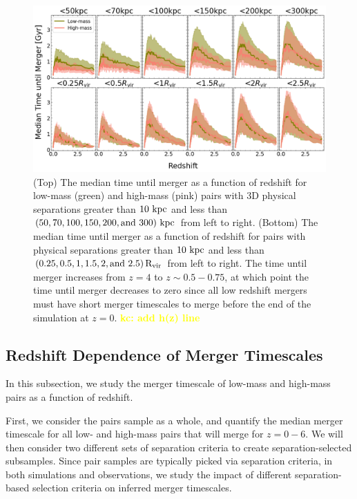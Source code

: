 \documentclass[twocolumn,linenumbers]{aastex631}
\newcommand{\kc}[1]{\textcolor{yellow}{\textbf{kc: #1}} }
\begin{document}
    \begin{figure}[htb]
        \centering
        \includegraphics[width=\textwidth]{plots/bet-on-it/3_time_til_merger.png}
        \caption{(Top) The median time until merger as a function of redshift for low-mass (green) and high-mass (pink) pairs with 3D physical separations greater than $10\,\mathrm{\,kpc}$ and less than $(50,70,100,150,200,\mbox{and }300)\,\mathrm{\,kpc}$ from left to right. 
        (Bottom) The median time until merger as a function of redshift for pairs with physical separations greater than $10\,\mathrm{\,kpc}$ and less than $(0.25, 0.5, 1, 1.5, 2,\mbox{and }2.5)\,\rm R_{vir}$ from left to right. 
        The time until merger increases from $z=4$ to $z\sim0.5-0.75$, at which point the time until merger decreases to zero since all low redshift mergers must have short merger timescales to merge before the end of the simulation at $z=0$. 
        \kc{add h(z) line}
        }
        \label{fig:timescales-sep}
    \end{figure} 
    
\subsection{Redshift Dependence of Merger Timescales}\label{sec:results-timevredshift}
    In this subsection, we study the merger timescale of low-mass and high-mass pairs as a function of redshift. 
    
    First, we consider the pairs sample as a whole, and quantify the median merger timescale for all low- and high-mass pairs that will merge for $z=0-6$. 
    We will then consider two different sets of separation criteria to create separation-selected subsamples.
    Since pair samples are typically picked via separation criteria, in both simulations and observations, we study the impact of different separation-based selection criteria on inferred merger timescales.
    
\end{document}
